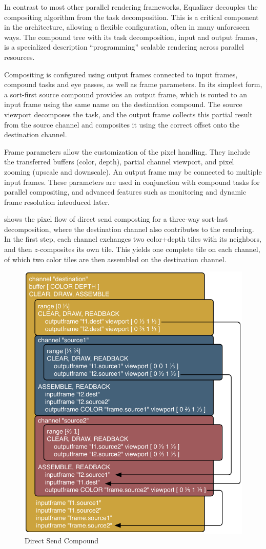 In contrast to most other parallel rendering frameworks, Equalizer decouples the
compositing algorithm from the task decomposition. This is a critical component
in the architecture, allowing a flexible configuration, often in many unforeseen
ways. The compound tree with its task decomposition, input and output frames, is
a specialized description ``programming'' scalable rendering across parallel
resources.

Compositing is configured using output frames connected to input frames,
compound tasks and eye passes, as well as frame parameters. In its simplest
form, a sort-first source compound provides an output frame, which is routed
to an input frame using the same name on the destination compound. The source
viewport decomposes the task, and the output frame collects this partial result
from the source channel and composites it using the correct offset onto the
destination channel.

Frame parameters allow the customization of the pixel handling. They include the
transferred buffers (color, depth), partial channel viewport, and pixel zooming
(upscale and downscale). An output frame may be connected to multiple input
frames. These parameters are used in conjunction with compound tasks for
parallel compositing, and advanced features such as monitoring and dynamic frame
resolution introduced later.

 shows the pixel flow of direct send composting for a three-way
sort-last decomposition, where the destination channel also contributes to the
rendering. In the first step, each channel exchanges two color+depth tiles with
its neighbors, and then $z$-composites its own tile. This yields one complete
tile on each channel, of which two color tiles are then assembled on the
destination channel.

\begin{figure}
  \includegraphics[width=.618\textwidth]{images/directSendCompound}
  {\caption{\label{fDirectSendCmp}Direct Send Compound}}
\end{figure}

